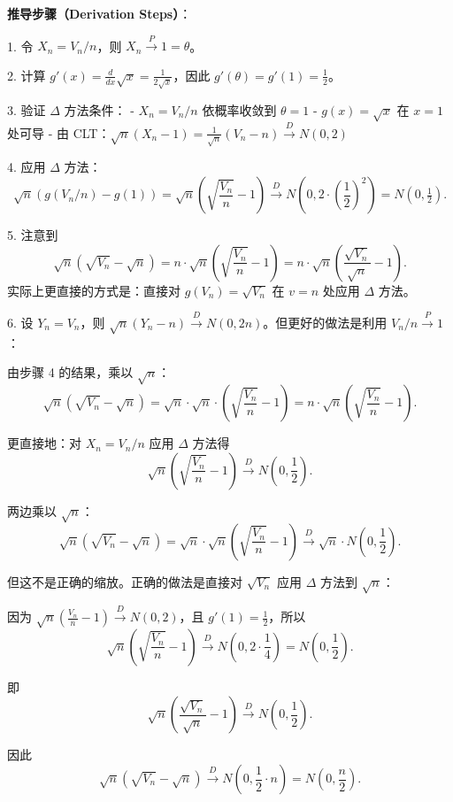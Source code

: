 \textbf{推导步骤（Derivation Steps）}：

1. 令 $X_n = V_n / n$，则 $X_n \xrightarrow{P} 1 = \theta$。

2. 计算 $g'(x) = \frac{d}{dx} \sqrt{x} = \frac{1}{2\sqrt{x}}$，因此 $g'(\theta) = g'(1) = \frac{1}{2}$。

3. 验证 $\Delta$ 方法条件：
   - $X_n = V_n / n$ 依概率收敛到 $\theta = 1$
   - $g(x) = \sqrt{x}$ 在 $x = 1$ 处可导
   - 由 CLT：$\sqrt{n}(X_n - 1) = \frac{1}{\sqrt{n}}(V_n - n) \xrightarrow{D} N(0, 2)$

4. 应用 $\Delta$ 方法：
\[
\sqrt{n}(g(V_n/n) - g(1)) = \sqrt{n}\left(\sqrt{\frac{V_n}{n}} - 1\right) \xrightarrow{D} N\left(0, 2 \cdot \left(\frac{1}{2}\right)^2\right) = N(0, \tfrac{1}{2}).
\]

5. 注意到
\[
\sqrt{n}(\sqrt{V_n} - \sqrt{n}) = n \cdot \sqrt{n}\left(\sqrt{\frac{V_n}{n}} - 1\right) = n \cdot \sqrt{n}\left(\frac{\sqrt{V_n}}{\sqrt{n}} - 1\right).
\]
实际上更直接的方式是：直接对 $g(V_n) = \sqrt{V_n}$ 在 $v = n$ 处应用 $\Delta$ 方法。

6. 设 $Y_n = V_n$，则 $\sqrt{n}(Y_n - n) \xrightarrow{D} N(0, 2n)$。但更好的做法是利用 $V_n / n \xrightarrow{P} 1$：

由步骤 4 的结果，乘以 $\sqrt{n}$：
\[
\sqrt{n}(\sqrt{V_n} - \sqrt{n}) = \sqrt{n} \cdot \sqrt{n} \cdot \left(\sqrt{\frac{V_n}{n}} - 1\right) = n \cdot \sqrt{n}\left(\sqrt{\frac{V_n}{n}} - 1\right).
\]

更直接地：对 $X_n = V_n / n$ 应用 $\Delta$ 方法得
\[
\sqrt{n}\left(\sqrt{\frac{V_n}{n}} - 1\right) \xrightarrow{D} N\left(0, \frac{1}{2}\right).
\]

两边乘以 $\sqrt{n}$：
\[
\sqrt{n}(\sqrt{V_n} - \sqrt{n}) = \sqrt{n} \cdot \sqrt{n}\left(\sqrt{\frac{V_n}{n}} - 1\right) \xrightarrow{D} \sqrt{n} \cdot N\left(0, \frac{1}{2}\right).
\]

但这不是正确的缩放。正确的做法是直接对 $\sqrt{V_n}$ 应用 $\Delta$ 方法到 $\sqrt{n}$：

因为 $\sqrt{n}(\frac{V_n}{n} - 1) \xrightarrow{D} N(0, 2)$，且 $g'(1) = \frac{1}{2}$，所以
\[
\sqrt{n}\left(\sqrt{\frac{V_n}{n}} - 1\right) \xrightarrow{D} N\left(0, 2 \cdot \frac{1}{4}\right) = N\left(0, \frac{1}{2}\right).
\]

即
\[
\sqrt{n}\left(\frac{\sqrt{V_n}}{\sqrt{n}} - 1\right) \xrightarrow{D} N\left(0, \frac{1}{2}\right).
\]

因此
\[
\sqrt{n}(\sqrt{V_n} - \sqrt{n}) \xrightarrow{D} N\left(0, \frac{1}{2} \cdot n\right) = N\left(0, \frac{n}{2}\right).
\]

